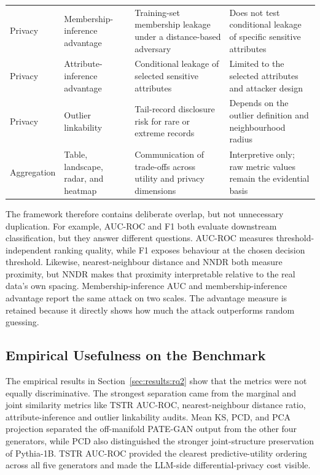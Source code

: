 \begin{table}[!htbp]
\begin{tabular}{p{2.0cm}p{3.2cm}p{4.0cm}p{4.2cm}}
Privacy & Membership-inference advantage & Training-set membership leakage under a distance-based adversary & Does not test conditional leakage of specific sensitive attributes \\
Privacy & Attribute-inference advantage & Conditional leakage of selected sensitive attributes & Limited to the selected attributes and attacker design \\
Privacy & Outlier linkability & Tail-record disclosure risk for rare or extreme records & Depends on the outlier definition and neighbourhood radius \\
\midrule
Aggregation & Table, landscape, radar, and heatmap & Communication of trade-offs across utility and privacy dimensions & Interpretive only; raw metric values remain the evidential basis \\
\bottomrule
\end{tabular}
\end{table}

The framework therefore contains deliberate overlap, but not unnecessary
duplication. For example, AUC-ROC and F1 both evaluate downstream
classification, but they answer different questions. AUC-ROC measures
threshold-independent ranking quality, while F1 exposes behaviour at the
chosen decision threshold. Likewise, nearest-neighbour distance and NNDR
both measure proximity, but NNDR makes that proximity interpretable
relative to the real data's own spacing. Membership-inference AUC and
membership-inference advantage report the same attack on two scales. 
The advantage measure is retained because it directly shows how much the
attack outperforms random guessing.

\subsection{Empirical Usefulness on the Benchmark}
\label{sec:results:rq1:empirical}

The empirical results in Section~\ref{sec:results:rq2} show that the
metrics were not equally discriminative. The strongest separation came
from the marginal and joint similarity metrics like TSTR AUC-ROC,
nearest-neighbour distance ratio, attribute-inference and outlier
linkability audits. Mean KS, PCD, and PCA projection separated the
off-manifold PATE-GAN output from the other four generators, while PCD
also distinguished the stronger joint-structure preservation of
Pythia-1B. TSTR AUC-ROC provided the clearest predictive-utility ordering
across all five generators and made the LLM-side differential-privacy cost
visible.

